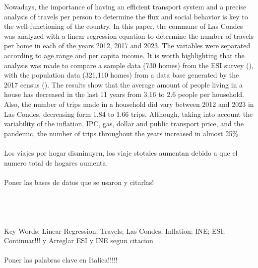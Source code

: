 \documentclass[12pt]{article} %
\begin{document}
\begin{titlepage}
\begin{justify}
    Nowadays, the importance of having an efficient transport 
    system and a precise analysis of travels per person to 
    determine the flux and social behavior is key to the 
    well-functioning of the country.  In this paper, the commune 
    of Las Condes was analyzed with a linear regression equation to 
    determine the number of travels per home in each of the years 2012, 
    2017 and 2023. The variables were separated according to age range 
    and per capita income. It is worth highlighting that the analysis 
    was made to compare a sample data (730 homes) from the ESI survey (\textbf{\cite{esi}}), with the population data (321,110 homes)
    from a data base generated by the 2017 census (\textbf{\cite{censo2017}}). 
    The results show that the average amount of people living in a house has decreased 
    in the last 11 years from 3.16 to 2.6 people per household. Also, the number of trips 
    made in a household did vary between 2012 and 2023 in Las Condes, decreasing form 
    1.84 to 1.66 trips. Although, taking into account the variability of the inflation, IPC, gas, dollar and public transport price, 
    and the pandemic, the number of trips throughout the years increased in almost 25\%. 
    \\ \\
    Los viajes por hogar disminuyen, los viaje stotales aumentan debido a que el numero total de hogares aumenta.
    \\ \\
    Poner las bases de datos que se usaron y citarlas!
    \\ \\ \\ \\ \\
    Key Words: Linear Regression; Travels; Las Condes; Inflation; INE; ESI; Continuar!!! y Arreglar ESI y INE segun citacion
    \\ \\
    Poner las palabras clave en Italica!!!!!
\end{justify}


\vspace{1cm}

\end{titlepage}
\end{document}
